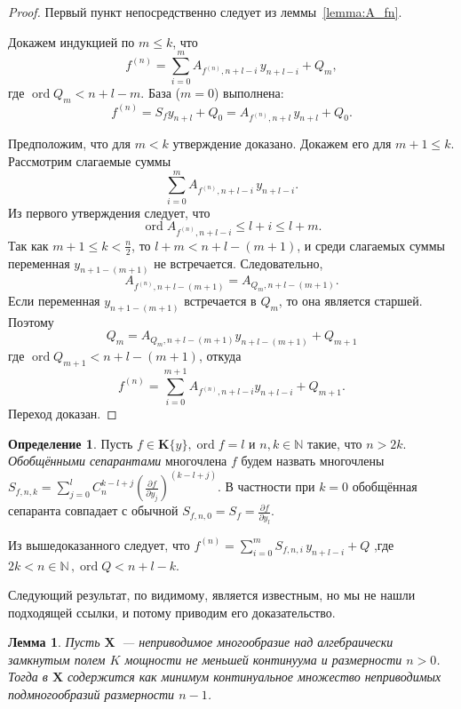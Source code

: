 \documentclass[16pt]{article}
\DeclareMathOperator{\ord}{ord}
\renewcommand{\le}{\leqslant} %
\theoremstyle{plain1}
\newtheorem{lemma}[theorem1]{Лемма}
\theoremstyle{plain2}
\theoremstyle{plain}
\theoremstyle{plain3}
\theoremstyle{definition}
\newtheorem{definition}[theorem2]{Определение}
\theoremstyle{remark}
\begin{document}
\begin{proof} Первый пункт непосредственно следует из леммы~\ref{lemma:A_fn}.

Докажем индукцией по $m\le k$, что
$$
f^{(n)}=\sum\limits_{i=0}^{m} A_{f^{(n)},n+l -i} \, y_{n+l -i} + Q_m,
$$
где $\ord Q_m < n+l-m$. База ($m = 0$) выполнена:
$$
 f^{(n)}=S_fy_{n+l}+Q_0=A_{f^{(n)}, n + l} \, y_{n+l} +Q_0.
$$

Предположим, что для $m<k$ утверждение доказано. Докажем его для $m+1\le k$.
Рассмотрим слагаемые суммы
$$
 \sum\limits_{i=0}^{m} A_{f^{(n)},n+l -i} \, y_{n+l -i}.
$$
Из первого утверждения следует, что
$$
\ord A_{f^{(n)},n+l -i}\le l+i\le l+m.
$$
Так как $m+1 \le k < \frac{n}{2}$, то $l+m < n+l-(m+1)$, 
и среди слагаемых суммы переменная $y_{n+1-(m+1)}$ не встречается.
Следовательно,
$$
A_{f^{(n)}, n+l-(m+1)} = A_{Q_{m}, n+l-(m+1)}.
$$
Если переменная $y_{n+1-(m+1)}$ встречается в $Q_m$, то она является старшей.
Поэтому
$$
 Q_{m}=A_{Q_{m}, n+l-(m+1)}y_{n+l-(m+1)}+Q_{m+1}
$$
где $\ord Q_{m+1}<n+l-(m+1)$,
откуда
$$
f^{(n)}=\sum\limits_{i=0}^{m+1} A_{f^{(n)},n+l-i}y_{n+l-i} + Q_{m+1}.
$$
Переход доказан.
\end{proof}
\begin{definition}
Пусть $f\in\mathbf{K}\{y\},\ord f=l$  и $n,k\in\mathbb{N}$ такие, что $n>2k$. \emph{Обобщёнными сепарантами} многочлена $f$ будем назвать многочлены $S_{f,n,k}=\sum\limits_{j=0}^{l}C_n^{k - l + j
}\left(\frac{\partial f}{\partial y_j}\right)^{(k - l + j)}$. В частности при $k=0$ обобщённая сепаранта совпадает с обычной $S_{f,n,0}=S_f = \frac{\partial f}{\partial y_l}$. 
\end{definition}
Из вышедоказанного следует, что $f^{(n)}= \sum\limits_{i=0}^{m} S_{f,n,i} \, y_{n+l -i}+ Q$ ,где $2k<n\in\mathbb{N}\,,\ord Q < n+l-k$.

Следующий результат, по видимому, является известным, но мы не нашли
подходящей ссылки, и потому приводим его доказательство.

\begin{lemma} \label{lemma:sb_vr_cntm}
Пусть $\mathbf{X}$~--- неприводимое многообразие над алгебраически замкнутым полем $K$
мощности не меньшей континуума и размерности $n>0$. Тогда в
$\mathbf{X}$ содержится как минимум континуальное множество
неприводимых подмногообразий размерности $n-1$.
\end{lemma}
\end{document}
